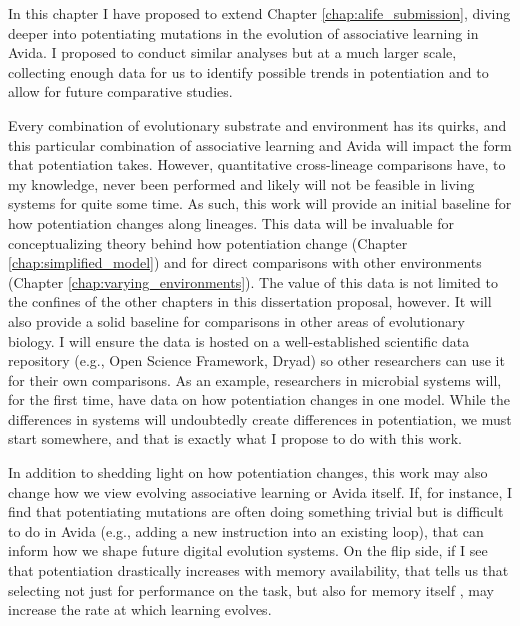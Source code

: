 In this chapter I have proposed to extend Chapter \ref{chap:alife_submission}, diving deeper into potentiating mutations in the evolution of associative learning in Avida. 
I proposed to conduct similar analyses but at a much larger scale, collecting enough data for us to identify possible trends in potentiation and to allow for future comparative studies. 

Every combination of evolutionary substrate and environment has its quirks, and this particular combination of associative learning and Avida will impact the form that potentiation takes. 
However, quantitative cross-lineage comparisons have, to my knowledge, never been performed and likely will not be feasible in living systems for quite some time. 
As such, this work will provide an initial baseline for how potentiation changes along lineages. 
This data will be invaluable for conceptualizing theory behind how potentiation change (Chapter \ref{chap:simplified_model}) and for direct comparisons with other environments (Chapter \ref{chap:varying_environments}). 
The value of this data is not limited to the confines of the other chapters in this dissertation proposal, however. 
It will also provide a solid baseline for comparisons in other areas of evolutionary biology. 
I will ensure the data is hosted on a well-established scientific data repository (e.g., Open Science Framework, Dryad) so other researchers can use it for their own comparisons. 
As an example, researchers in microbial systems will, for the first time, have data on how potentiation changes in one model. 
While the differences in systems will undoubtedly create differences in potentiation, we must start somewhere, and that is exactly what I propose to do with this work. 

In addition to shedding light on how potentiation changes, this work may also change how we view evolving associative learning or Avida itself. 
If, for instance, I find that potentiating mutations are often doing something trivial but is difficult to do in Avida (e.g., adding a new instruction into an existing loop), that can inform how we shape future digital evolution systems. 
On the flip side, if I see that potentiation drastically increases with memory availability, that tells us that selecting not just for performance on the task, but also for memory itself \citep{ollionLittleHelpSelection2012, schossauInformationTheoreticNeuroCorrelatesBoost2016}, may increase the rate at which learning evolves. 


